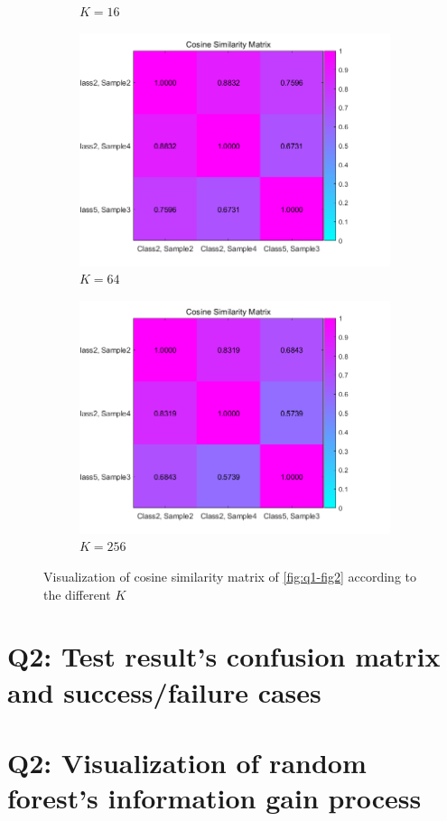 \begin{figure}[htbp]
\begin{subfigure}[t]{0.25\linewidth}
		\caption{$K=16$}
	\end{subfigure}%
	\hfill
	\begin{subfigure}[t]{0.25\linewidth}
		\centering
		\includegraphics[width=\linewidth]{image/q1-appendix/similarity_64.png} 
		\caption{$K=64$}
	\end{subfigure}%
	\hfill
	\begin{subfigure}[t]{0.25\linewidth}
		\centering
		\includegraphics[width=\linewidth]{image/q1-appendix/similarity_256.png} 
		\caption{$K=256$}
	\end{subfigure}%
	\caption{Visualization of cosine similarity matrix of \cref{fig:q1-fig2} according to the different $K$}
	\label{fig:q1_cossim}
\end{figure}

\section{Q2: Test result's confusion matrix and success/failure cases}
\label{subsec:Q2-app1}

\section{Q2: Visualization of random forest's information gain process}
\label{subsec:Q2-app2}
